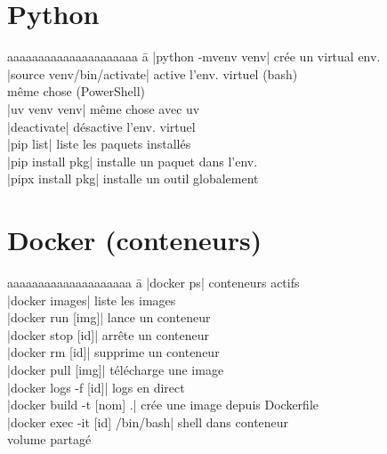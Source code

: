 \documentclass{article}
\begin{document}
\begin{multicols}{4}
    \section*{Python}
    \begin{tabbing}
        aaaaaaaaaaaaaaaaaaaaa \= a \kill
        \code|python -mvenv venv| \> crée un virtual env. \\
        \code|source venv/bin/activate| \> active l'env. virtuel (bash) \\
         \> même chose (PowerShell) \\
        \code|uv venv venv| \> même chose avec uv \\
        \code|deactivate| \> désactive l'env. virtuel \\
        \code|pip list| \> liste les paquets installés \\
        \code|pip install pkg| installe un paquet dans l'env. \\
        \code|pipx install pkg| installe un outil globalement \\
    \end{tabbing}

    \section*{Docker (conteneurs)}
    \begin{tabbing}
        aaaaaaaaaaaaaaaaaaaa \= a \kill
        \code|docker ps| \> conteneurs actifs \\
        \code|docker images| \> liste les images \\
        \code|docker run [img]| \> lance un conteneur \\
        \code|docker stop [id]| \> arrête un conteneur \\
        \code|docker rm [id]| \> supprime un conteneur \\
        \code|docker pull [img]| \> télécharge une image \\
        \code|docker logs -f [id]| \> logs en direct \\
        \code|docker build -t [nom] .| crée une image depuis Dockerfile \\
        \code|docker exec -it [id] /bin/bash| shell dans conteneur \\
         volume partagé \\
    \end{tabbing}


\end{multicols}
\end{document}
